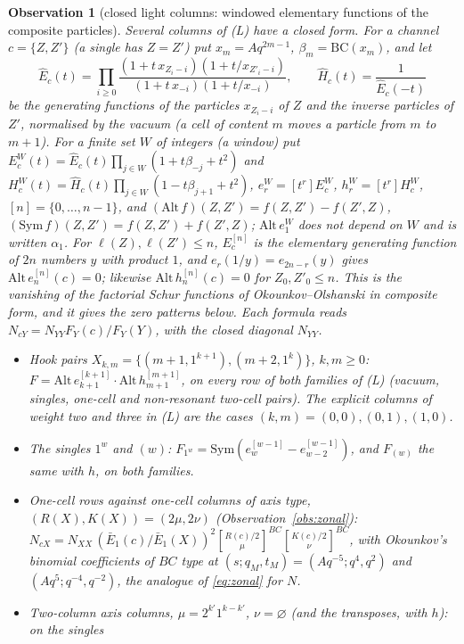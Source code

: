 \documentclass[11pt]{article}
\newtheorem{observation}{Observation}
\newcommand{\cbin}[2]{\genfrac{[}{]}{0pt}{}{#1}{#2}}
\begin{document}
\begin{observation}[closed light columns: windowed elementary functions of the composite particles]\label{obs:interp}
Several columns of (L) have a closed form.  For a channel $c=\{Z,Z'\}$ (a single has $Z=Z'$) put $x_m=Aq^{2m-1}$,
$\beta_m=\mathrm{BC}(x_m)$, and let
\[
\hat E_c(t)=\prod_{i\ge0}\frac{(1+t\,x_{Z_i-i})(1+t/x_{Z'_i-i})}{(1+t\,x_{-i})(1+t/x_{-i})},\qquad
\hat H_c(t)=\frac1{\hat E_c(-t)}
\]
be the generating functions of the particles $x_{Z_i-i}$ of $Z$ and the inverse particles of $Z'$, normalised by the
vacuum (a cell of content $m$ moves a particle from $m$ to $m+1$).  For a finite set $W$ of integers (a \emph{window})
put $E^W_c(t)=\hat E_c(t)\prod_{j\in W}(1+t\beta_{-j}+t^2)$ and $H^W_c(t)=\hat H_c(t)\prod_{j\in W}(1-t\beta_{j+1}+t^2)$,
$e^W_r=[t^r]E^W_c$, $h^W_r=[t^r]H^W_c$, $[n]=\{0,\dots,n-1\}$, and $(\mathrm{Alt}\,f)(Z,Z')=f(Z,Z')-f(Z',Z)$,
$(\mathrm{Sym}\,f)(Z,Z')=f(Z,Z')+f(Z',Z)$; $\mathrm{Alt}\,e^W_1$ does not depend on $W$ and is written $\alpha_1$.  For
$\ell(Z),\ell(Z')\le n$, $E^{[n]}_c$ is the elementary generating function of $2n$ numbers $y$ with product $1$, and
$e_r(1/y)=e_{2n-r}(y)$ gives $\mathrm{Alt}\,e^{[n]}_n(c)=0$; likewise $\mathrm{Alt}\,h^{[n]}_n(c)=0$ for $Z_0,Z'_0\le n$.
This is the vanishing of the factorial Schur functions of Okounkov--Olshanski in composite form, and it gives the zero
patterns below.  Each formula reads $N_{cY}=N_{YY}F_Y(c)/F_Y(Y)$, with the closed diagonal $N_{YY}$.
\begin{itemize}
\item[(H)] Hook pairs $X_{k,m}=\{(m+1,1^{k+1}),(m+2,1^k)\}$, $k,m\ge0$:
$F=\mathrm{Alt}\,e^{[k+1]}_{k+1}\cdot\mathrm{Alt}\,h^{[m+1]}_{m+1}$, on every row of both families of (L) (vacuum,
singles, one-cell and non-resonant two-cell pairs).  The explicit columns of weight two and three in (L) are the cases
$(k,m)=(0,0),(0,1),(1,0)$.
\item[(S)] The singles $1^w$ and $(w)$: $F_{1^w}=\mathrm{Sym}(e^{[w-1]}_w-e^{[w-1]}_{w-2})$, and $F_{(w)}$ the same
with $h$, on both families.
\item[(Z)] One-cell rows against one-cell columns of axis type, $(R(X),K(X))=(2\mu,2\nu)$ (Observation~\ref{obs:zonal}):
$N_{cX}=N_{XX}\,(\bar E_1(c)/\bar E_1(X))^2\cbin{R(c)/2}{\mu}^{BC}\cbin{K(c)/2}{\nu}^{BC}$, with Okounkov's
binomial coefficients of $BC$ type at $(s;q_M,t_M)=(Aq^{-5};q^4,q^2)$ and $(Aq^5;q^{-4},q^{-2})$, the analogue of
\eqref{eq:zonal} for $N$.
\item[(J)] Two-column axis columns, $\mu=2^{k'}1^{k-k'}$, $\nu=\varnothing$ (and the transposes, with $h$): on the singles

\end{itemize}
\end{observation}
\end{document}
